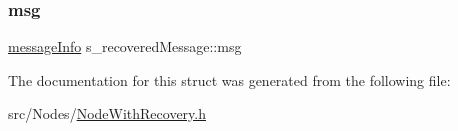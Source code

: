 \subsubsection{\texorpdfstring{msg}{msg}}
{\footnotesize\ttfamily \hyperlink{structures_8h_a7e7bdc1d2fff8a9436f2f352b2711ed6}{message\+Info} s\+\_\+recovered\+Message\+::msg}



The documentation for this struct was generated from the following file\+:\begin{DoxyCompactItemize}
\item 
src/\+Nodes/\hyperlink{NodeWithRecovery_8h}{Node\+With\+Recovery.\+h}\end{DoxyCompactItemize}
